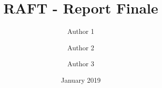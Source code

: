 \documentclass{scrartcl}
\title{\LARGE
    RAFT - Report Finale
}
\author{
    Author 1 \\ \emailaddr{sara.kiade@studio.unibo.it}
    \and 
    Author 2 \\ \emailaddr{gyiordan.caminati@studio.unibo.it} 
    \and 
    Author 3 \\ \emailaddr{luca.giulianini2@studio.unibo.it}
}
\date{January 2019}
\begin{document}
\maketitle











\nocite{*} %


\end{document}
